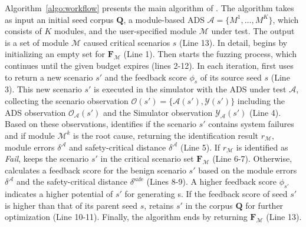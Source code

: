 Algorithm~\ref{algo:workflow} presents the main algorithm of \tool. The algorithm takes as input an initial seed corpus \( \mathbf{Q} \), a module-based ADS \( \mathcal{A} = \{{M}^{1}, \dots, {M}^{K}\} \), which consists of \( K \) modules, and the user-specified module $\mathcal{M}$ under test.
The output is a set of module $\mathcal{M}$ caused critical scenarios $s$ (Line 13).
In detail, \tool begins by initializing an empty set for $\mathbf{F}_{\mathcal{M}}$ (Line 1). 
Then \tool starts the fuzzing process, which continues until the given budget expires (lines 2-12). 
In each iteration, \tool first uses \select to return a new scenario \( s' \) and the feedback score \(\phi_s\) of its source seed \( s \) (Line 3). 
This new scenario \( s' \) is executed in the simulator with the ADS under test \( \mathcal{A} \), collecting the scenario observation \( \mathcal{O}(s') = \{\mathcal{A}(s'), \mathcal{Y}(s')\} \) including the ADS observation \( \mathcal{O}_{\mathcal{A}}(s') \) and the Simulator observation \( \mathcal{Y}_{\mathcal{A}}(s') \) (Line 4).
Based on these observations, \oracle identifies if the scenario \( s' \) contains system failures and if module \( \mathcal{M}^k \) is the root cause, returning the identification result \( r_{\mathcal{M}} \), module errors $\delta^{\mathcal{A}}$ and safety-critical distance $\delta^{\mathcal{A}}$ (Line 5). 
If \( r_{\mathcal{M}} \) is identified as \textit{Fail}, \tool keeps the scenario \( s' \) in the critical scenario set \(\mathbf{F}_{\mathcal{M}}\) (Line 6-7). 
Otherwise, \feedback calculates a feedback score for the benign scenario \( s' \) based on the module errors \( \delta^{\mathcal{A}} \) and the safety-critical distance \( \delta^{\text{safe}} \) (Lines 8-9).
A higher feedback score \( \phi_{s'} \) indicates a higher potential of \( s' \) for generating {\mccs}s. If the feedback score of seed \( s' \) is higher than that of its parent seed \( s \), \tool retains \( s' \) in the corpus $\mathbf{Q}$ for further optimization (Line 10-11). 
Finally, the algorithm ends by returning $\mathbf{F}_{\mathcal{M}}$ (Line 13).

